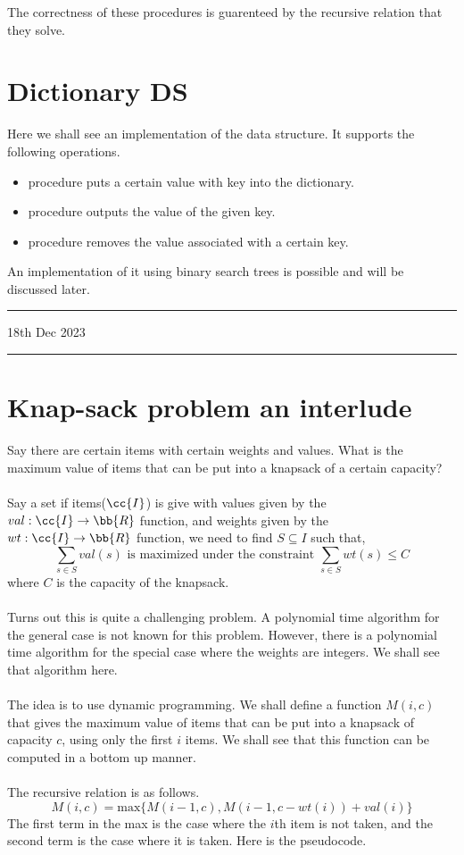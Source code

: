 \documentclass{myclass}
\begin{document}
The correctness of these procedures is guarenteed by the recursive relation that they solve.

\section*{Dictionary DS}

Here we shall see an implementation of the  data structure. It supports the 
following operations.

\begin{itemize}
    \item {} procedure puts a certain value with key into the dictionary.
    \item {} procedure outputs the value of the given key.
    \item {} procedure removes the value associated with a certain key.
\end{itemize}

An implementation of it using binary search trees is possible and will be discussed later.

\hrule
\vspace{-0.15cm}
\begin{flushleft}
    18th Dec 2023
\end{flushleft}
\vspace{-0.15cm}
\hrule

\section*{Knap-sack problem an interlude}

 Say there are certain items with certain weights and values. What is the maximum value of items that can be put into a knapsack of a certain capacity?
\\\\
Say a set if items($\cc{I}$) is give with values given by the $ val:\cc{I} \to \bb{R} $ function, and weights given by the $ wt:\cc{I} \to \bb{R} $ function, 
we need to find $S\subseteq I$ such that, $$\sum_{s\in S}val(s)\text{ is maximized under the constraint }\sum_{s\in S}wt(s)\leq C$$
where $C$ is the capacity of the knapsack.  
\\\\
Turns out this is quite a challenging problem. A polynomial time algorithm for the general case is not known for this problem. 
However, there is a polynomial time algorithm for the special case where the weights are integers. We shall see that algorithm here.
\\\\
The idea is to use dynamic programming. We shall define a function $M(i,c)$ that gives the maximum value of items that can be put into a knapsack of capacity $c$,
using only the first $i$ items. We shall see that this function can be computed in a bottom up manner.
\\\\
The recursive relation is as follows.
$$M(i,c) = \text{max}\{M(i-1,c),M(i-1,c-wt(i))+val(i)\}$$
The first term in the max is the case where the $i$th item is not taken, and the second term is the case where it is taken.
Here is the pseudocode.
\end{document}
